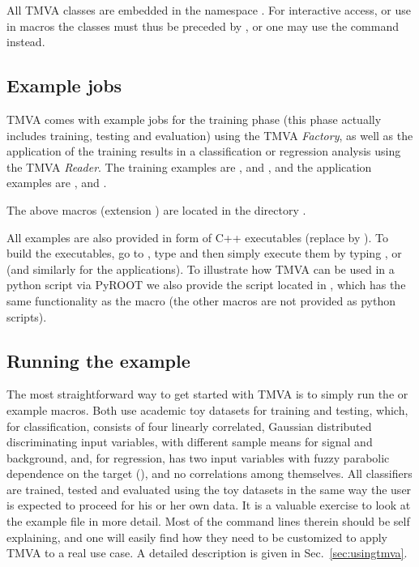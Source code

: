 All TMVA classes are embedded in the namespace . For interactive access, or 
use in macros the classes must thus be preceded by , or one may use the 
command    instead. 

\subsection{Example jobs}
\label{sec:examplejob}

TMVA comes with example jobs for the training phase (this phase actually 
includes training, testing and evaluation) using the TMVA {\em Factory}, 
as well as the application of the training results in a classification or regression analysis
using the TMVA {\em Reader}. The training examples are
,
 and
, and the application examples are 
,
 and
.

The above macros (extension )
are located in the directory . 

All examples are also provided in form of C++ executables
(replace  by ). To build the executables, go to
, type  and then simply execute them by typing
,  or  (and similarly for the 
applications). To illustrate how TMVA can be used 
in a python script via PyROOT we also provide the script  located 
in , which has the same functionality as the macro 
(the other macros are not provided as python scripts).

\subsection{Running the example}
\label{sec:qs:example}

The most straightforward way to get started with TMVA is to simply run the  
or  example macros. Both use academic toy datasets for training 
and testing, which, for classification, consists of four linearly correlated, Gaussian 
distributed discriminating input variables, with different sample means for signal and 
background, and, for regression, has two input variables with fuzzy parabolic dependence 
on the target (), and no correlations among themselves. All 
classifiers are trained, tested and evaluated using the toy datasets in the
same way the user is expected to proceed for his or her own data. It
is a valuable exercise to look at the example file in more detail. Most 
of the command lines therein should be self explaining, and one will easily 
find how they need to be customized to apply TMVA to a real use case.
A detailed description is given in Sec.~\ref{sec:usingtmva}.


